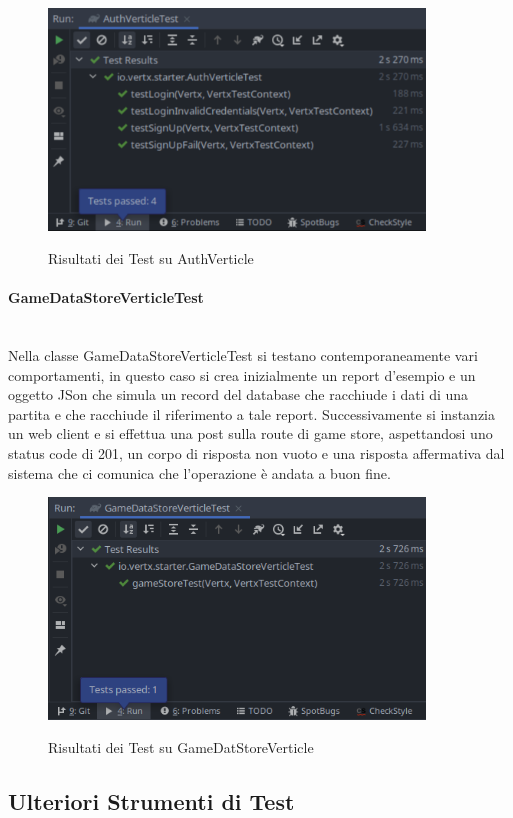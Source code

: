 \begin{figure}[H]
    \caption{Risultati dei Test su AuthVerticle}
    \centering
    \includegraphics[width=100mm]{img/general/test_auth.png}
    \label{fig:test_auth}
\end{figure}

\paragraph{GameDataStoreVerticleTest}\mbox{}\\
Nella classe GameDataStoreVerticleTest si testano contemporaneamente vari comportamenti, in questo caso si crea inizialmente un report d'esempio e un oggetto JSon che simula un record del database che racchiude i dati di una partita e che racchiude il riferimento a tale report. Successivamente si instanzia un web client e si effettua una post sulla route di game store, aspettandosi uno status code di 201, un corpo di risposta non vuoto e una risposta affermativa dal sistema che ci comunica che l'operazione è andata a buon fine.
\begin{figure}[H]
    \caption{Risultati dei Test su GameDatStoreVerticle}
    \centering
    \includegraphics[width=100mm]{img/general/test_store.png}
    \label{fig:test_store}
\end{figure}
\subsection{Ulteriori Strumenti di Test}

